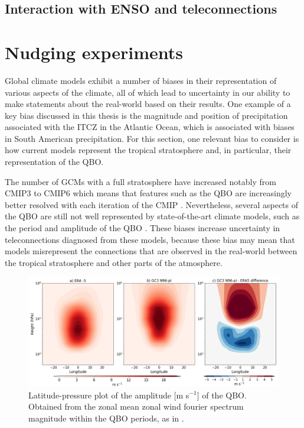 \subsection{Interaction with ENSO and teleconnections}

\section{Nudging experiments}



Global climate models exhibit a number of biases in their representation of various aspects of the climate, all of which lead to uncertainty in our ability to make statements about the real-world based on their results. One example of a key bias discussed in this thesis is the magnitude and position of precipitation associated with the ITCZ in the Atlantic Ocean, which is associated with biases in South American precipitation. %
For this section, one relevant bias to consider is how current models represent the tropical stratosphere and, in particular, their representation of the QBO.


The number of GCMs with a full stratosphere have increased notably from CMIP3 to CMIP6 which means that features such as the QBO are increasingly better resolved with each iteration of the CMIP \citep{bushell2020,richter2020}. Nevertheless, several aspects of the QBO are still not well represented by state-of-the-art climate models, such as the period and amplitude of the QBO \citep{schenzinger2017,richter2020}. 
These biases increase uncertainty in teleconnections diagnosed from these models, because these bias may mean that models misrepresent the connections that are observed in the real-world between the tropical stratosphere and other parts of the atmosphere. 

\begin{figure}[t!]
\centering
 \includegraphics[width=\linewidth]{figures/qboamplitude.png}
\caption[QBO amplitude bias]{Latitude-pressure plot of the amplitude [m s$^{-1}$] of the QBO. Obtained from the zonal mean zonal wind fourier spectrum magnitude within the QBO periods, as in \cite{schenzinger2017}. }
\label{fig:qboamplitude}
\end{figure}

